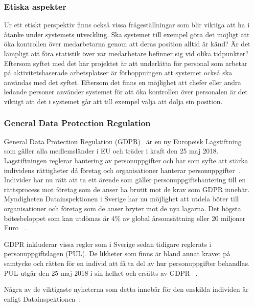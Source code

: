 \documentclass[a4paper,12pt]{article}
\begin{document}
 \subsubsection{Etiska aspekter}
 Ur ett etiskt perspektiv finns också vissa frågeställningar som blir viktiga att ha i åtanke under systemets utveckling. Ska systemet till exempel göra det möjligt att öka kontrollen över medarbetarna genom att deras position alltid är känd? Är det lämpligt att föra statistik över var medarbetare befinner sig vid olika tidpunkter? Eftersom syftet med det här projektet är att underlätta för personal som arbetar på aktivitetsbaserade arbetsplatser är förhoppningen att systemet också ska användas med det syftet. Eftersom det finns en möjlighet att chefer eller andra ledande personer använder systemet för att öka kontrollen över personalen är det viktigt att det i systemet går att till exempel välja att dölja sin position.

 \subsubsection{General Data Protection Regulation}\label{GDPR}
 General Data Protection Regulation (GDPR)~\cite{GDPRdatainspektionen} är en ny Europeisk Lagstiftning som gäller alla medlemsländer i EU och träder i kraft den 25 maj 2018.
 Lagstiftningen reglerar hantering av personuppgifter och har som syfte att stärka individens rättigheter då företag och organisationer hanterar personuppgifter~\cite{GDPRibm,GDPRdatainspektionen}.
 Individer har nu rätt att ta ett ärende som gäller personuppgiftshantering till en rättsprocess mot företag som de anser ha brutit mot de krav som GDPR innebär.
 Myndigheten Datainspektionen i Sverige har nu möjlighet att utdela böter till organisationer och företag som de anser bryter mot de nya lagarna. Det högsta bötesbeloppet som kan utdömas är 4\% av global årsomsättning eller 20 miljoner Euro ~\cite{GDPRibm}.

 GDPR inkluderar vissa regler som i Sverige sedan tidigare reglerats i personuppgiftslagen (PUL). De likheter som finns är bland annat kravet på samtycke och rätten för en individ att få ta del av hur personuppgifter behandlas. PUL utgår den 25 maj 2018 i sin helhet och ersätts av GDPR ~\cite{GDPRdatainspektionen}.

 Några av de viktigaste nyheterna som detta innebär för den enskilda individen är enligt Datainspektionen~\cite{GDPRdatainspektionen}:

\end{document}
